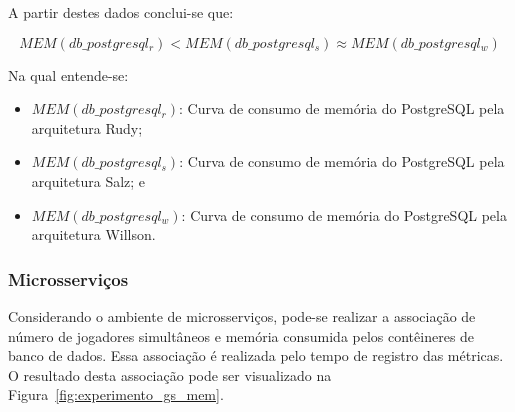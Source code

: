 A partir destes dados conclui-se que:

$$
    MEM(db\_postgresql_{r}) < MEM(db\_postgresql_{s}) \approx MEM(db\_postgresql_{w})
$$

Na qual entende-se:

\begin{itemize}
\item $MEM(db\_postgresql_{r})$: Curva de consumo de memória do PostgreSQL pela arquitetura Rudy;
\item $MEM(db\_postgresql_{s})$: Curva de consumo de memória do PostgreSQL pela arquitetura Salz; e
\item $MEM(db\_postgresql_{w})$: Curva de consumo de memória do PostgreSQL pela arquitetura Willson.
\end{itemize}


\subsubsection{Microsserviços}

Considerando o ambiente de microsserviços, pode-se realizar a associação de número de jogadores simultâneos e memória consumida pelos contêineres de banco de dados.
%
Essa associação é realizada pelo tempo de registro das métricas.
%
O resultado desta associação pode ser visualizado na Figura~\ref{fig:experimento_gs_mem}.


